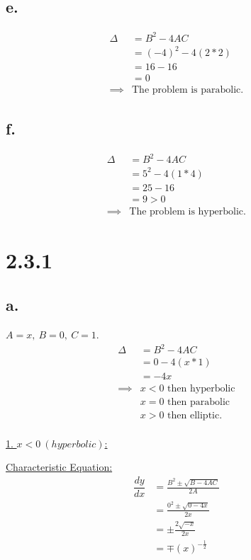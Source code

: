 \documentclass{article}
\begin{document}
\subsection*{e.}
\begin{align*}
  \Delta &= B^2 - 4AC &&\\
  &= (-4)^2 - 4(2*2) &&\\
  &= 16 - 16 &&\\
  &= 0 &&\\
  \implies& \text{The problem is parabolic.}
\end{align*}

\subsection*{f.}
\begin{align*}
  \Delta &= B^2 - 4AC &&\\
  &= 5^2 - 4(1*4) &&\\
  &= 25 - 16 &&\\
  &= 9 > 0 &&\\
  \implies& \text{The problem is hyperbolic.}
\end{align*}

\section*{2.3.1}
\subsection*{a.}
$A=x, \: B=0, \: C=1$.
\begin{align*}
  \Delta &= B^2 - 4AC &&\\
  &= 0 - 4(x*1) &&\\
  &= -4x &&\\
  \implies& x < 0 \text{ then hyperbolic} &&\\
  & x = 0 \text{ then parabolic} &&\\
  & x > 0 \text{ then elliptic.} &&\\
\end{align*}

\underline{1. $x < 0 \: (hyperbolic)$:}
\newline

\quad \underline{Characteristic Equation:}
\begin{align*}
  \dfrac{dy}{dx} &= \frac{B^2 \pm \sqrt{B - 4AC}}{2A} &&\\
  &= \frac{0^2 \pm \sqrt{0 - 4x}}{2x} &&\\
  &= \pm \frac{2 \sqrt{-x}}{2x} &&\\
  &= \mp (x)^{-\frac{1}{2}} &&\\
\end{align*}
\end{document}
